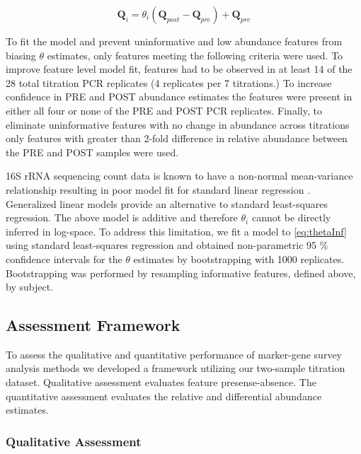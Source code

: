 \documentclass[linenumbers]{bmcart}
\begin{document}
\begin{equation}
  \textbf{Q}_{i} = \theta_i (\textbf{Q}_{post} -\textbf{Q}_{pre}) + \textbf{Q}_{pre}
  \label{eq:thetaInf}
\end{equation}

To fit the model and prevent uninformative and low abundance features
from biasing \(\theta\) estimates, only features meeting the following
criteria were used. To improve feature level model fit, features had to be observed in at least 14 of the 28 total titration PCR replicates (4 replicates per 7 titrations.)
To increase confidence in PRE and POST abundance estimates the features were present in either all four or none of the PRE and POST PCR replicates.
Finally, to eliminate uninformative features with no change in abundance across titrations only features with greater than 2-fold difference in relative abundance between the PRE and POST samples were used.

16S rRNA sequencing count data is known to have a non-normal
mean-variance relationship resulting in poor model fit for standard
linear regression \cite{McMurdie2014}. Generalized linear models
provide an alternative to standard least-squares regression. The above
model is additive and therefore \(\theta_i\) cannot be directly inferred
in log-space. To address this limitation, we fit a model to \eqref{eq:thetaInf}
using standard least-squares regression and obtained non-parametric 95 \%
confidence intervals for the \(\theta\) estimates by bootstrapping with 1000
replicates. Bootstrapping was performed by resampling informative features, defined above, by subject.

\subsection*{Assessment Framework}
To assess the qualitative and quantitative performance of marker-gene survey analysis methods we developed a framework utilizing our two-sample titration dataset. Qualitative assessment evaluates feature presense-absence. The quantitative assessment evaluates the relative and differential abundance estimates.

\subsubsection*{Qualitative Assessment}
\end{document}
